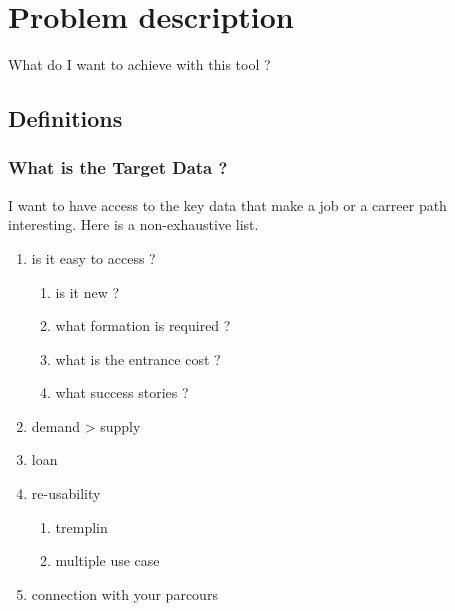 \documentclass[11pt]{article}
\author{teddd}
\date{\today}
\title{}
\begin{document}
\tableofcontents

\section{Problem description}
\label{sec:org9c94ad2}
What do I want to achieve with this tool ? 
\subsection{Definitions}
\label{sec:orgd8d2454}
\subsubsection{What is the Target Data ?}
\label{sec:org84d6b0f}
I want to have access to the key data that make a job or a carreer path interesting. Here is a non-exhaustive list.
\begin{enumerate}
\item is it easy to access ?
\label{sec:orgf31c87a}
\begin{enumerate}
\item is it new ?
\label{sec:orgc917c96}
\item what formation is required ?
\label{sec:org33f91cd}
\item what is the entrance cost ?
\label{sec:orga3a94bd}
\item what success stories ?
\label{sec:org53e1a5f}
\end{enumerate}
\item demand > supply
\label{sec:org2fa6a66}
\item loan
\label{sec:orga83b524}
\item re-usability
\label{sec:orgf03b375}
\begin{enumerate}
\item tremplin
\label{sec:org7354487}
\item multiple use case
\label{sec:orga4d0c8c}
\end{enumerate}
\item connection with your parcours
\label{sec:org5aa779d}
\end{enumerate}
\end{document}
